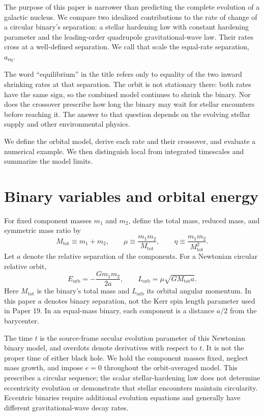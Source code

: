 \documentclass[12pt]{article}
\begin{document}
The purpose of this paper is narrower than predicting the complete evolution of a galactic nucleus. We compare two idealized contributions to the rate of change of a circular binary's separation: a stellar hardening law with constant hardening parameter and the leading-order quadrupole gravitational-wave law. Their rates cross at a well-defined separation. We call that scale the equal-rate separation, $a_{\mathrm{eq}}$.

The word ``equilibrium'' in the title refers only to equality of the two inward shrinking rates at that separation. The orbit is not stationary there: both rates have the same sign, so the combined model continues to shrink the binary. Nor does the crossover prescribe how long the binary may wait for stellar encounters before reaching it. The answer to that question depends on the evolving stellar supply and other environmental physics.

We define the orbital model, derive each rate and their crossover, and evaluate a numerical example. We then distinguish local from integrated timescales and summarize the model limits.

\section{Binary variables and orbital energy}

For fixed component masses $m_1$ and $m_2$, define the total mass, reduced mass, and symmetric mass ratio by
\begin{equation}
  M_{\mathrm{tot}}\equiv m_1+m_2,
  \qquad
  \mu\equiv\frac{m_1m_2}{M_{\mathrm{tot}}},
  \qquad
  \eta\equiv\frac{m_1m_2}{M_{\mathrm{tot}}^2}.
  \label{eq:mass-variables}
\end{equation}
Let $a$ denote the relative separation of the components. For a Newtonian circular relative orbit,
\begin{equation}
  E_{\mathrm{orb}}=-\frac{Gm_1m_2}{2a},
  \qquad
  L_{\mathrm{orb}}=\mu\sqrt{GM_{\mathrm{tot}}a}.
  \label{eq:orbital-energy-angular-momentum}
\end{equation}
Here $M_{\mathrm{tot}}$ is the binary's total mass and $L_{\mathrm{orb}}$ its orbital angular momentum. In this paper $a$ denotes binary separation, not the Kerr spin length parameter used in Paper 19. In an equal-mass binary, each component is a distance $a/2$ from the barycenter.

The time $t$ is the source-frame secular evolution parameter of this Newtonian binary model, and overdots denote derivatives with respect to $t$. It is not the proper time of either black hole. We hold the component masses fixed, neglect mass growth, and impose $e=0$ throughout the orbit-averaged model. This prescribes a circular sequence; the scalar stellar-hardening law does not determine eccentricity evolution or demonstrate that stellar encounters maintain circularity. Eccentric binaries require additional evolution equations and generally have different gravitational-wave decay rates.
\end{document}
